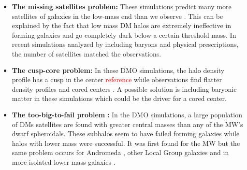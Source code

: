 \begin{itemize}
    \item\textbf{The missing satellites problem:} These simulations predict many more satellites of galaxies in the low-mass end than we observe \citep{Klypin...missingsatellites...1999, Moore...missingsatellites..1999}. This can be explained by the fact that low mass \ac{DM} halos are extremely ineffective in forming galaxies and go completely dark below a certain threshold mass. In recent simulations analyzed by \citet{Sawala...noCDMproblems...2016} including baryons and physical prescriptions, the number of satellites matched the observations.
    \item \textbf{The cusp-core problem:} In these \ac{DMO} simulations, the halo density profile has a cusp in the center \textcolor{red}{reference} while observations find flatter density profiles and cored centers \citep{Flores...cuspcoreprob...1994, Moore...cuspcoreprob...1994}. A possible solution is including baryonic matter in these simulations which could be the driver for a cored center. 
    \item \textbf{The too-big-to-fail problem} \citep{Boylan...toobigtoofail...2011}\textbf{:} In the \ac{DMO} simulations, a large population of \acp{DM} satellites are found with greater central masses than any of the \ac{MW}'s dwarf spheroidals. These subhalos seem to have failed forming galaxies while halos with lower mass were successful. It was first found for the \ac{MW} but the same problem occurs for Andromeda \citep{Tollerud...M31tbtf...2014}, other Local Group galaxies \citep{Kirby...LGtbtf...2014} and in more isolated lower mass galaxies \citep{Ferrero...DGtbtf...2012, Papastergis...DGtbtf...2015, Papastergis...DGtbtf...2016}.
    \iffalse\item The planes of satellites problem: \fi
\end{itemize}

